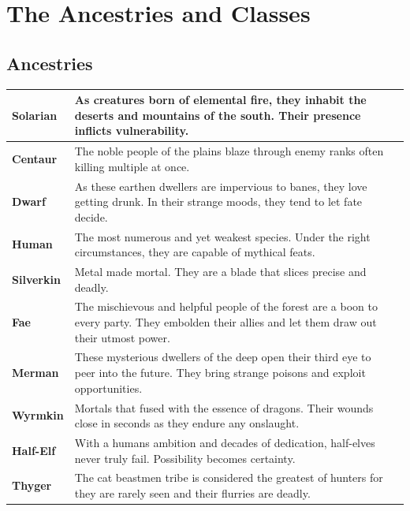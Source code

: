 
\section{The Ancestries and Classes}\label{Section_CharDescription}

\subsection*{Ancestries}

\begin{longtable}{|p{2.5cm}|p{13.2cm}|p{0.5cm}|}
	\hline
	\textbf{Solarian} \symFire&  As creatures born of elemental  fire, they inhabit the deserts and mountains of the south. Their presence inflicts vulnerability. & \symVulnerable\\
	\hline
	\textbf{Centaur}&  The noble people  of the plains blaze through enemy ranks often killing multiple at once.& \symBlaze\\
	\hline
	\textbf{Dwarf} \symEarth&  As these earthen dwellers are impervious to banes, they love getting drunk. In their strange moods, they tend to let fate decide.& \symDSix\\
	\hline
	\textbf{Human}&  The most numerous and yet weakest species. Under the right circumstances, they are capable of mythical feats.& \symShield\\
	\hline
	\textbf{Silverkin} \symMetal& Metal made mortal. They are a blade that slices precise and deadly.& \symAdvantage\\
	\hline
	\textbf{Fae} &  The mischievous and helpful people of the forest are a boon to every party. They embolden their allies and let them draw out their utmost power.& \symStun\\
	\hline
	\textbf{Merman} \symWater&  These mysterious dwellers of the deep open their third eye to peer into the future. They bring strange poisons and exploit opportunities.& \symPoison\\
	\hline
	\textbf{Wyrmkin}&  Mortals that fused with the essence of dragons. %
	Their wounds close in seconds as they endure any onslaught.& \symHeal\\
	\hline
	\textbf{Half-Elf} \symWood&  With a humans ambition and decades of dedication, half-elves never truly fail. Possibility becomes certainty.& \symPowerful\\
	\hline
	\textbf{Thyger}&  The cat beastmen tribe is considered the greatest of hunters for they are rarely seen and their flurries are deadly.& \symFlurry\\
	\hline
\end{longtable}

